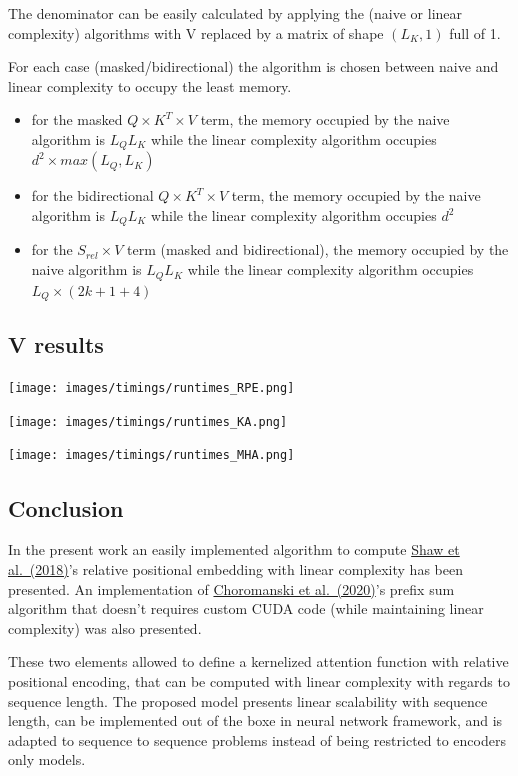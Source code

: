The denominator can be easily calculated by applying the (naive or
linear complexity) algorithms with V replaced by a matrix of shape
\((L_K, 1)\) full of 1.

For each case (masked/bidirectional) the algorithm is chosen between
naive and linear complexity to occupy the least memory.

\begin{itemize}
\tightlist
\item
  for the masked \(Q \times K^T \times V\) term, the memory occupied by
  the naive algorithm is \(L_QL_K\) while the linear complexity
  algorithm occupies \(d^2 \times max(L_Q, L_K)\)
\item
  for the bidirectional \(Q \times K^T \times V\) term, the memory
  occupied by the naive algorithm is \(L_QL_K\) while the linear
  complexity algorithm occupies \(d^2\)
\item
  for the \(S_{rel} \times V\) term (masked and bidirectional), the
  memory occupied by the naive algorithm is \(L_QL_K\) while the linear
  complexity algorithm occupies \(L_Q \times (2k+1 + 4)\)
\end{itemize}

\hypertarget{v-results}{%
\subsection{V results}\label{v-results}}

\texttt{[image: images/timings/runtimes\_RPE.png]}

\texttt{[image: images/timings/runtimes\_KA.png]}

\texttt{[image: images/timings/runtimes\_MHA.png]}

\hypertarget{conclusion}{%
\subsection{Conclusion}\label{conclusion}}

In the present work an easily implemented algorithm to compute
\href{https://arxiv.org/abs/1803.02155}{Shaw et al.~(2018)}'s relative
positional embedding with linear complexity has been presented. An
implementation of \href{https://arxiv.org/abs/2009.14794}{Choromanski et
al.~(2020)}'s prefix sum algorithm that doesn't requires custom CUDA
code (while maintaining linear complexity) was also presented.

These two elements allowed to define a kernelized attention function
with relative positional encoding, that can be computed with linear
complexity with regards to sequence length. The proposed model presents
linear scalability with sequence length, can be implemented out of the
boxe in neural network framework, and is adapted to sequence to sequence
problems instead of being restricted to encoders only models.
